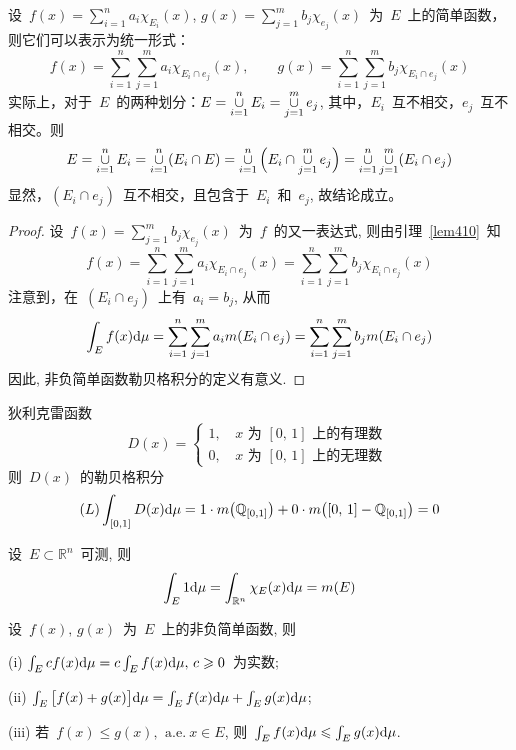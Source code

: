 \begin{lemma} \label{lem410}
设~$f(x)=\sum\limits_{i=1}^n a_i \chi_{E_i}(x)$, $g(x)=\sum\limits_{j=1}^m b_j \chi_{e_j}(x)$~为~$E$~上的简单函数，则它们可以表示为统一形式：
\[
f(x)=\sum\limits_{i=1}^n \sum\limits_{j=1}^m a_i \chi_{E_i \cap e_j}(x), \qquad g(x)= \sum\limits_{i=1}^n \sum\limits_{j=1}^m b_j \chi_{E_i \cap e_j}(x)
\]
实际上，对于~$E$~的两种划分：$E=\mathop{\mathop{\cup}}\limits_{i=1}^n E_i=\mathop{\mathop{\cup}}\limits_{j=1}^m e_j$, 其中，$E_i$~互不相交，$e_j$~互不相交。则
\[
E=\mathop{\mathop{\cup}}\limits_{i=1}^n E_i = \mathop{\mathop{\cup}}\limits_{i=1}^n (E_i \cap E) = \mathop{\mathop{\cup}}\limits_{i=1}^n \Big(E_i \cap \mathop{\mathop{\cup}}\limits_{j=1}^m e_j \Big) =\mathop{\mathop{\cup}}\limits_{i=1}^n \mathop{\mathop{\cup}}\limits_{j=1}^m (E_i \cap e_j)
\]
显然，$(E_i \cap e_j)$~互不相交，且包含于~$E_i$~和~$e_j$, 故结论成立。
\end{lemma}

\begin{proof}
设~$f(x) = \sum\limits_{j=1}^m b_j \chi_{e_j}(x)$~为~$f$~的又一表达式, 则由引理~\ref{lem410}~知
\[
f(x)=\sum\limits_{i=1}^n \sum\limits_{j=1}^m a_i \chi_{E_i \cap e_j}(x) = \sum\limits_{i=1}^n \sum\limits_{j=1}^m b_j \chi_{E_i \cap e_j}(x)
\]
注意到，在~$(E_i \cap e_j)$~上有~$a_i=b_j$, 从而
\[
\int_E f(x) \mathrm{d} \mu = \sum_{i=1}^n \sum_{j=1}^m a_i m(E_i \cap e_j) = \sum_{i=1}^n \sum_{j=1}^m b_j m(E_i \cap e_j)
\]
因此, 非负简单函数勒贝格积分的定义有意义.
\end{proof}

\begin{example}
狄利克雷函数
\[
D(x) = \left\{ \!\!
\begin{array}{ll}
1,\, & x \mbox{~为~} [0,\, 1] \mbox{~上的有理数~} \\[0.1cm]
0,\, & x \mbox{~为~} [0,\, 1] \mbox{~上的无理数~}
\end{array}
\right.
\]
则~$D(x)$~的勒贝格积分
\[
(L)\int_{[0,1]} D(x) \mathrm{d} \mu = 1 \cdot m\big(\mathbb{Q}_{[0,1]}\big) + 0 \cdot m\big([0,\, 1] - \mathbb{Q}_{[0,1]} \big) = 0
\]
\end{example}

\begin{example}
设~$E \subset \mathbb{R}^n$~可测, 则
\[
\int_E 1 \mathrm{d} \mu = \int_{\mathbb{R}^n} \chi_E(x) \mathrm{d} \mu = m(E)
\]
\end{example}

\begin{proposition} \label{prop411}
设~$f(x),\,g(x)$~为~$E$~上的非负简单函数, 则

(i) $\int_E c f(x) \mathrm{d} \mu = c \int_E f(x) \mathrm{d} \mu, \, c \geqslant 0$~为实数;

(ii) $\int_E \big[f(x) + g(x)\big] \mathrm{d} \mu = \int_E f(x) \mathrm{d} \mu + \int_E g(x) \mathrm{d} \mu$;

(iii) 若~$f(x) \leqslant g(x),\, \mathrm{~a.e.~} x \in E$, 则~$\int_E f(x) \mathrm{d} \mu \leqslant \int_E g(x) \mathrm{d} \mu$.
\end{proposition}

